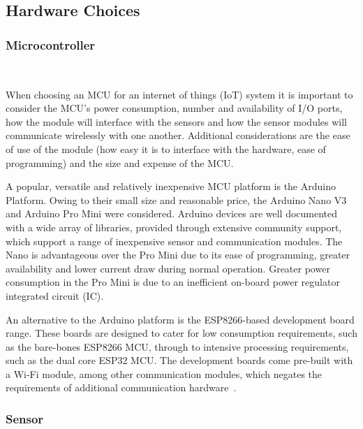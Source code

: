 \documentclass[10pt,twocolumn]{witseiepaper}
\begin{document}
	\subsection{Hardware Choices} 
	
		\subsubsection{Microcontroller} $   $
		
			When choosing an MCU for an internet of things (IoT) system it is important to consider the MCU's power consumption, number and availability of I/O ports, how the module will interface with the sensors and how the sensor modules will communicate wirelessly with one another. Additional considerations are the ease of use of the module (how easy it is to interface with the hardware, ease of programming) and the size and expense of the MCU.
			
			A popular, versatile and relatively inexpensive MCU platform is the Arduino Platform. Owing to their small size and reasonable price, the Arduino Nano V3 and Arduino Pro Mini were considered. Arduino devices are well documented with a wide array of libraries, provided through extensive community support, which support a range of inexpensive sensor and communication modules. The Nano is advantageous over the Pro Mini due to its ease of programming, greater availability and lower current draw during normal operation. Greater power consumption in the Pro Mini is due to an inefficient on-board power regulator integrated circuit (IC).

			An alternative to the Arduino platform is the ESP8266-based development board range. %
			These boards are designed to cater for low consumption requirements, such as the bare-bones ESP8266 MCU, through to intensive processing requirements, such as the dual core ESP32 MCU. The development boards come pre-built with a \mbox{Wi-Fi} module, among other communication modules, which negates the requirements of additional communication hardware~\cite{esp12e}.
			
		\subsubsection{Sensor} $   $
			
\end{document}
